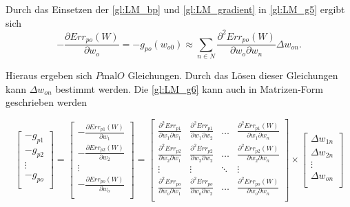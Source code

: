 Durch das Einsetzen der \autoref{gl:LM_bp} und \autoref{gl:LM_gradient} in \autoref{gl:LM_g5} ergibt sich
\begin{equation}
-\frac{\partial Err_{po}(W)}{\partial w_{o}}  = -g_{po}(w_{o0}) \approx \sum\limits_{n \in N} \frac{\partial^2 Err_{po}(W)}{\partial w_{o} \partial w_{n}} \Delta w_{on} .
\label{gl:LM_g6}
\end{equation}

Hieraus ergeben sich $P \text{mal} O$ Gleichungen. Durch das Lösen dieser Gleichungen kann $\Delta w_{on}$ bestimmt werden. Die \autoref{gl:LM_g6} kann auch in Matrizen-Form geschrieben werden

\begin{equation}
 \begin{bmatrix}
  -g_{p1}   \\
  -g_{p2}   \\
  \vdots    \\
  -g_{po}   \\ 
 \end{bmatrix}
 =
  \begin{bmatrix}
  -\frac{\partial Err_{p1}(W)}{\partial w_{1}}   \\
  -\frac{\partial Err_{p2}(W)}{\partial w_{2}}   \\
  \vdots    \\
  -\frac{\partial Err_{po}(W)}{\partial w_{o}}   \\ 
 \end{bmatrix}
 =
 \begin{bmatrix}
    \frac{\partial^2 Err_{p1}}{\partial w_{1} \partial w_{1}} & \frac{\partial^2 Err_{p1}}{\partial w_{1} \partial w_{2}}  & \dots  & \frac{\partial^2 Err_{p1}(W)}{\partial w_{1} \partial w_{n}} \\
    \frac{\partial^2 Err_{p2}}{\partial w_{2} \partial w_{1}} & \frac{\partial^2 Err_{p2}}{\partial w_{2} \partial w_{2}}  & \dots  & \frac{\partial^2 Err_{p2}(W)}{\partial w_{2} \partial w_{n}} \\
    \vdots & \vdots & \ddots & \vdots \\
    \frac{\partial^2 Err_{po}}{\partial w_{o} \partial w_{1}} & \frac{\partial^2 Err_{po}}{\partial w_{o} \partial w_{2}}  & \dots  & \frac{\partial^2 Err_{po}(W)}{\partial w_{o} \partial w_{n}} \\
 \end{bmatrix}
\times
 \begin{bmatrix}
  \Delta w_{1n}  \\
  \Delta w_{2n}  \\
  \vdots    \\
  \Delta w_{on}   \\ 
 \end{bmatrix}
\label{gl:LM_matrix-schreibweise}
\end{equation}

